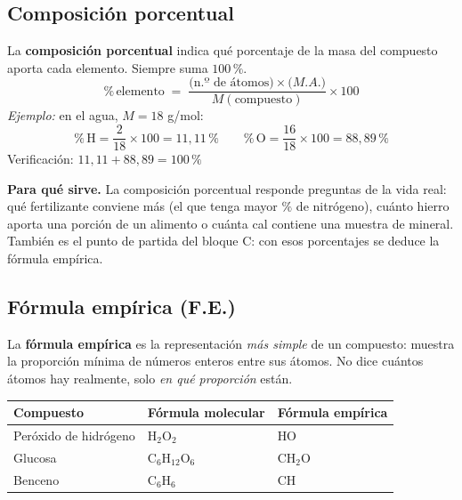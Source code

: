 \documentclass[12pt, letterpaper]{article}
\newcommand{\pc}{\text{\%}}
\begin{document}
\subsection{Composición porcentual}

\begin{cuadroteoria}
  La \textbf{composición porcentual} indica qué porcentaje de la masa del compuesto aporta cada elemento. Siempre suma $100\,\pc$.
  \[
    \pc\,\text{elemento} \;=\; \frac{\bigl(\text{n.º de átomos}\bigr)\times \bigl(M.A.\bigr)}{M(\text{compuesto})}\times 100
  \]
  \emph{Ejemplo:} en el agua, $M = 18$ g/mol:
  \[
    \pc\,\text{H} = \frac{2}{18}\times100 = 11{,}11\,\pc
    \qquad
    \pc\,\text{O} = \frac{16}{18}\times100 = 88{,}89\,\pc
  \]
  Verificación: $11{,}11 + 88{,}89 = 100\,\pc$ \checkmark
\end{cuadroteoria}

\begin{cuadroextra}
  \textbf{Para qué sirve.} La composición porcentual responde preguntas de la vida real: qué fertilizante conviene más (el que tenga mayor $\pc$ de nitrógeno), cuánto hierro aporta una porción de un alimento o cuánta cal contiene una muestra de mineral. También es el punto de partida del bloque C: con esos porcentajes se deduce la fórmula empírica.
\end{cuadroextra}

\subsection{Fórmula empírica (F.E.)}

\begin{cuadroteoria}
  La \textbf{fórmula empírica} es la representación \emph{más simple} de un compuesto: muestra la proporción mínima de números enteros entre sus átomos. No dice cuántos átomos hay realmente, solo \emph{en qué proporción} están.
  \begin{center}
    \small
    \begin{tabular}{lll}
      \toprule
      Compuesto & Fórmula molecular & Fórmula empírica \\
      \midrule
      Peróxido de hidrógeno & $\text{H}_2\text{O}_2$ & $\text{HO}$ \\
      Glucosa               & $\text{C}_6\text{H}_{12}\text{O}_6$ & $\text{CH}_2\text{O}$ \\
      Benceno               & $\text{C}_6\text{H}_6$ & $\text{CH}$ \\
      \bottomrule
    \end{tabular}
  \end{center}
\end{cuadroteoria}
\end{document}
